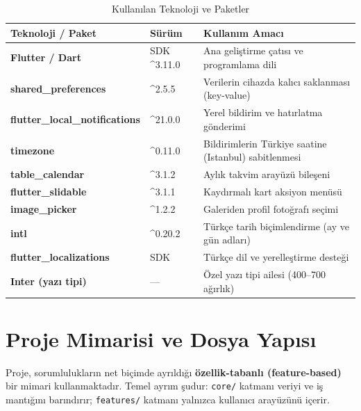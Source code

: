 \documentclass[12pt,a4paper]{article}
\begin{document}
\begin{table}[H]
    \centering
    \caption{Kullanılan Teknoloji ve Paketler}
    \label{tab:teknolojiler}
    \renewcommand{\arraystretch}{1.3}
    \begin{tabularx}{\textwidth}{>{\bfseries}l l X}
        \toprule
        Teknoloji / Paket & Sürüm & Kullanım Amacı \\
        \midrule
        Flutter / Dart & SDK \^{}3.11.0 & Ana geliştirme çatısı ve programlama dili \\
        shared\_preferences & \^{}2.5.5 & Verilerin cihazda kalıcı saklanması (key-value) \\
        flutter\_local\_notifications & \^{}21.0.0 & Yerel bildirim ve hatırlatma gönderimi \\
        timezone & \^{}0.11.0 & Bildirimlerin Türkiye saatine (Istanbul) sabitlenmesi \\
        table\_calendar & \^{}3.1.2 & Aylık takvim arayüzü bileşeni \\
        flutter\_slidable & \^{}3.1.1 & Kaydırmalı kart aksiyon menüsü \\
        image\_picker & \^{}1.2.2 & Galeriden profil fotoğrafı seçimi \\
        intl & \^{}0.20.2 & Türkçe tarih biçimlendirme (ay ve gün adları) \\
        flutter\_localizations & SDK & Türkçe dil ve yerelleştirme desteği \\
        Inter (yazı tipi) & --- & Özel yazı tipi ailesi (400--700 ağırlık) \\
        \bottomrule
    \end{tabularx}
\end{table}

\section{Proje Mimarisi ve Dosya Yapısı}

Proje, sorumlulukların net biçimde ayrıldığı \textbf{özellik-tabanlı (feature-based)} bir mimari kullanmaktadır. Temel ayrım şudur: \texttt{core/} katmanı veriyi ve iş mantığını barındırır; \texttt{features/} katmanı yalnızca kullanıcı arayüzünü içerir.
\end{document}
